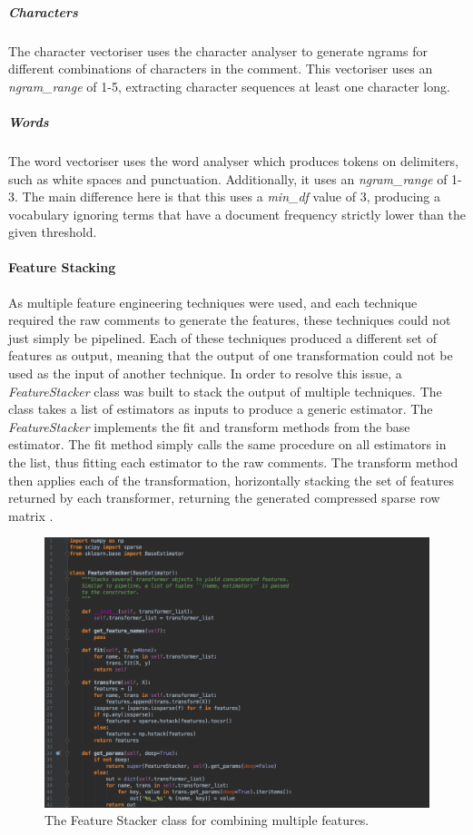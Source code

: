 \subparagraph{Characters} The character vectoriser uses the character analyser to generate ngrams for different combinations of characters in the comment. This vectoriser uses an \textit{ngram\_range} of 1-5, extracting character sequences at least one character long.

\subparagraph{Words} The word vectoriser uses the word analyser which produces tokens on delimiters, such as white spaces and punctuation. Additionally, it uses an \textit{ngram\_range} of 1-3. The main difference here is that this uses a \textit{min\_df} value of 3, producing a vocabulary ignoring terms that have a document frequency strictly lower than the given threshold.

\paragraph{Feature Stacking}
As multiple feature engineering techniques were used, and each technique required the raw comments to generate the features, these techniques could not just simply be pipelined. Each of these techniques produced a different set of features as output, meaning that the output of one transformation could not be used as the input of another technique. In order to resolve this issue, a \textit{FeatureStacker} class was built to stack the output of multiple techniques. The class takes a list of estimators as inputs to produce a generic estimator. The \textit{FeatureStacker} implements the fit and transform methods from the base estimator. The fit method simply calls the same procedure on all estimators in the list, thus fitting each estimator to the raw comments. The transform method then applies each of the transformation, horizontally stacking the set of features returned by each transformer, returning the generated compressed sparse row matrix \cite{Scipy:ToCSR}.

\begin{figure}[H]
	\centering
	\includegraphics[width=\textwidth]{Images/Implementation/DataProcessing/AbuseDetection/FeatureStacker}
	\caption{The Feature Stacker class for combining multiple features.}
	\label{fig:AbuseDetection-FeatureStacker}
\end{figure}

